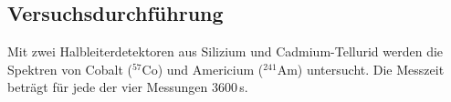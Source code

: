 \subsection{Versuchsdurchführung}
Mit zwei Halbleiterdetektoren aus Silizium und Cadmium-Tellurid werden die Spektren von Cobalt ($^{57}$Co)
und Americium ($^{241}$Am) untersucht. Die Messzeit beträgt für jede der vier Messungen 3600\,s.
